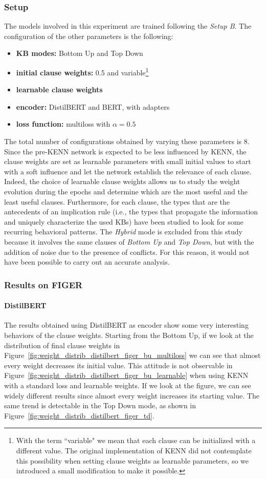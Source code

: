\subsubsection{Setup}
The models involved in this experiment are trained following the \textit{Setup B}. The configuration of the other parameters is the following:
\begin{itemize}
    \item \textbf{KB modes:} Bottom Up and Top Down
    \item \textbf{initial clause weights:} 0.5 and variable\footnote{With the term ``variable" we mean that each clause can be initialized with a different value. The original implementation of KENN did not contemplate this possibility when setting clause weights as learnable parameters, so we introduced a small modification to make it possible.}
    \item \textbf{learnable clause weights}
    \item \textbf{encoder:} DistilBERT and BERT, with adapters
    \item \textbf{loss function:} multiloss with $\alpha = 0.5$
\end{itemize}
The total number of configurations obtained by varying these parameters is 8. Since the pre-KENN network is expected to be less influenced by KENN, the clause weights are set as learnable parameters with small initial values to start with a soft influence and let the network establish the relevance of each clause. Indeed, the choice of learnable clause weights allows us to study the weight evolution during the epochs and determine which are the most useful and the least useful clauses. Furthermore, for each clause, the types that are the antecedents of an implication rule (i.e., the types that propagate the information and uniquely characterize the used KBs) have been studied to look for some recurring behavioral patterns. The \textit{Hybrid} mode is excluded from this study because it involves the same clauses of \textit{Bottom Up} and \textit{Top Down}, but with the addition of noise due to the presence of conflicts. For this reason, it would not have been possible to carry out an accurate analysis.

\subsubsection{Results on FIGER}
\paragraph{DistilBERT}
The results obtained using DistilBERT as encoder show some very interesting behaviors of the clause weights. Starting from the Bottom Up, if we look at the distribution of final clause weights in Figure~\ref{fig:weight_distrib_distilbert_figer_bu_multiloss} we can see that almost every weight decreases its initial value. This attitude is not observable in Figure~\ref{fig:weight_distrib_distilbert_figer_bu_learnable} when using KENN with a standard loss and learnable weights. If we look at the figure, we can see widely different results since almost every weight increases its starting value. The same trend is detectable in the Top Down mode, as shown in Figure~\ref{fig:weight_distrib_distilbert_figer_td}.

